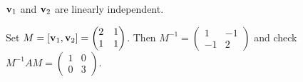 \documentclass[10pt, a4paper]{article}
\begin{document}
\begin{example}
\begin{solution}
        $\mathbf{v}_1$ and $\mathbf{v}_2$ are linearly independent.

        Set $M = [\mathbf{v}_1, \mathbf{v}_2] = \begin{pmatrix}
            2 & 1 \\ 1 & 1
        \end{pmatrix}$.
        Then $M ^ {-1} = \begin{pmatrix}
            1 & -1 \\ -1 & 2
        \end{pmatrix}$ and check $M ^ {-1}AM = \begin{pmatrix}
            1 & 0 \\ 0 & 3
        \end{pmatrix}$.
    \end{solution}
\end{example}
\end{document}
